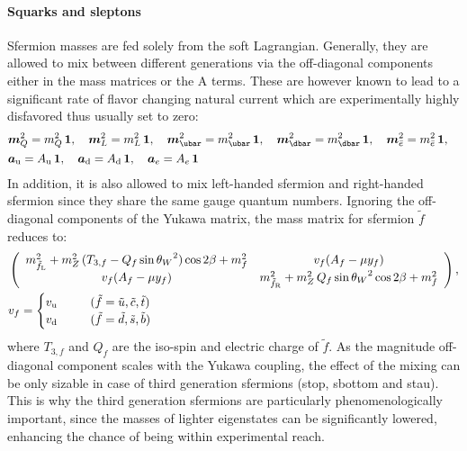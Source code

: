 \paragraph{Squarks and sleptons}
Sfermion masses are fed solely from the soft Lagrangian. Generally, they are allowed to mix between different generations via the off-diagonal components either in the mass matrices or the A terms. These are however known to lead to a significant rate of flavor changing natural current which are experimentally highly disfavored thus usually set to zero:
\begin{align}
&  \bm{m}^2_{Q}    = m^2_{Q} \,    \bm{1}, \,\,\,\,\,\,
  \bm{m}_{L}^2    = m_{L}^2 \,    \bm{1}, \,\,\,\,\,\,
  \bm{m}_{\ubar}^2 = m_{\ubar}^2 \, \bm{1}, \,\,\,\,\,\,
  \bm{m}_{\dbar}^2 = m_{\dbar}^2 \, \bm{1}, \,\,\,\,\,\,
  \bm{m}_{\ebar}^2 = m_{\ebar}^2 \, \bm{1}, \,\,\,\,\,\, \nn \\
%
& \bm{a}_\mup = A_\mup \, \bm{1}, \,\,\,\,\,\,
  \bm{a}_\mdn = A_\mdn \, \bm{1}, \,\,\,\,\,\,
  \bm{a}_e    = A_e \, \bm{1}
\end{align}
In addition, it is also allowed to mix left-handed sfermion and right-handed sfermion since they share the same gauge quantum numbers. Ignoring the off-diagonal components of the Yukawa matrix, the mass matrix for sfermion $\tilde{f}$ reduces to:
\begin{align}
& \left(  
  \begin{array}{cc}
    m^2_{\tilde{f}_{\mL}} + m_Z^2 \,(T_{3,f}-Q_f\sin{\theta_W}^2) \cos{2\beta} + m^2_f    &  v_f ( A_f - \mu y_f)         \\
    v_f ( A_f - \mu y_f)                &     m^2_{\tilde{f}_{\mR}} + m_Z^2 \, Q_f\sin{\theta_W}^2\cos{2\beta} + m^2_f    
  \end{array} 
\right), \nn  \\
%
& v_f = \begin{cases}
  v_{\mup} \mbox{\phantom{MMM}} (\tilde{f}=\tilde{u}, \tilde{c}, \tilde{t}) \\
  v_{\mdn} \mbox{\phantom{MMM}} (\tilde{f}=\tilde{d}, \tilde{s}, \tilde{b}) 
     \end{cases}
%
\end{align}
where $T_{3,f}$ and $Q_f$ are the iso-spin and electric charge of $\tilde{f}$. As the magnitude off-diagonal component scales with the Yukawa coupling, the effect of the mixing can be only sizable in case of third generation sfermions (stop, sbottom and stau).
This is why the third generation sfermions are particularly phenomenologically important,   
since the masses of lighter eigenstates can be significantly lowered, enhancing the chance of being within experimental reach.  \\



